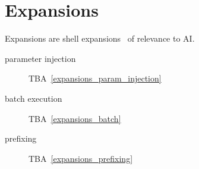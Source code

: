 \section{Expansions}
\label{expansions}

Expansions are shell expansions~ of relevance to AI.
%
\begin{description}
    \item[parameter injection]{TBA~\ref{expansions_param_injection}}
    \item[batch execution]{TBA~\ref{expansions_batch}}
    \item[prefixing]{TBA~\ref{expansions_prefixing}}
\end{description}



